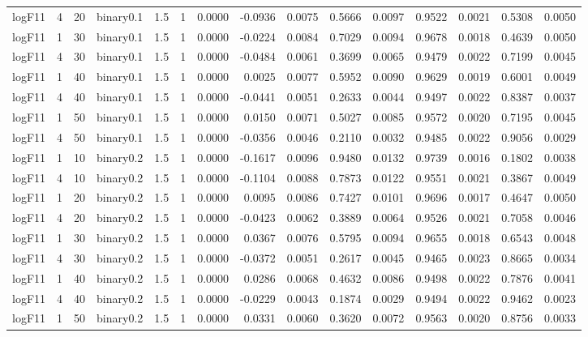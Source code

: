 \begin{longtable}{rrrrrrrrrrrrrrr}
  logF11 & 4 & 20 & binary0.1 & 1.5 & 1 & 0.0000 & -0.0936 & 0.0075 & 0.5666 & 0.0097 & 0.9522 & 0.0021 & 0.5308 & 0.0050 \\ 
  logF11 & 1 & 30 & binary0.1 & 1.5 & 1 & 0.0000 & -0.0224 & 0.0084 & 0.7029 & 0.0094 & 0.9678 & 0.0018 & 0.4639 & 0.0050 \\ 
  logF11 & 4 & 30 & binary0.1 & 1.5 & 1 & 0.0000 & -0.0484 & 0.0061 & 0.3699 & 0.0065 & 0.9479 & 0.0022 & 0.7199 & 0.0045 \\ 
  logF11 & 1 & 40 & binary0.1 & 1.5 & 1 & 0.0000 & 0.0025 & 0.0077 & 0.5952 & 0.0090 & 0.9629 & 0.0019 & 0.6001 & 0.0049 \\ 
  logF11 & 4 & 40 & binary0.1 & 1.5 & 1 & 0.0000 & -0.0441 & 0.0051 & 0.2633 & 0.0044 & 0.9497 & 0.0022 & 0.8387 & 0.0037 \\ 
  logF11 & 1 & 50 & binary0.1 & 1.5 & 1 & 0.0000 & 0.0150 & 0.0071 & 0.5027 & 0.0085 & 0.9572 & 0.0020 & 0.7195 & 0.0045 \\ 
  logF11 & 4 & 50 & binary0.1 & 1.5 & 1 & 0.0000 & -0.0356 & 0.0046 & 0.2110 & 0.0032 & 0.9485 & 0.0022 & 0.9056 & 0.0029 \\ 
  logF11 & 1 & 10 & binary0.2 & 1.5 & 1 & 0.0000 & -0.1617 & 0.0096 & 0.9480 & 0.0132 & 0.9739 & 0.0016 & 0.1802 & 0.0038 \\ 
  logF11 & 4 & 10 & binary0.2 & 1.5 & 1 & 0.0000 & -0.1104 & 0.0088 & 0.7873 & 0.0122 & 0.9551 & 0.0021 & 0.3867 & 0.0049 \\ 
  logF11 & 1 & 20 & binary0.2 & 1.5 & 1 & 0.0000 & 0.0095 & 0.0086 & 0.7427 & 0.0101 & 0.9696 & 0.0017 & 0.4647 & 0.0050 \\ 
  logF11 & 4 & 20 & binary0.2 & 1.5 & 1 & 0.0000 & -0.0423 & 0.0062 & 0.3889 & 0.0064 & 0.9526 & 0.0021 & 0.7058 & 0.0046 \\ 
  logF11 & 1 & 30 & binary0.2 & 1.5 & 1 & 0.0000 & 0.0367 & 0.0076 & 0.5795 & 0.0094 & 0.9655 & 0.0018 & 0.6543 & 0.0048 \\ 
  logF11 & 4 & 30 & binary0.2 & 1.5 & 1 & 0.0000 & -0.0372 & 0.0051 & 0.2617 & 0.0045 & 0.9465 & 0.0023 & 0.8665 & 0.0034 \\ 
  logF11 & 1 & 40 & binary0.2 & 1.5 & 1 & 0.0000 & 0.0286 & 0.0068 & 0.4632 & 0.0086 & 0.9498 & 0.0022 & 0.7876 & 0.0041 \\ 
  logF11 & 4 & 40 & binary0.2 & 1.5 & 1 & 0.0000 & -0.0229 & 0.0043 & 0.1874 & 0.0029 & 0.9494 & 0.0022 & 0.9462 & 0.0023 \\ 
  logF11 & 1 & 50 & binary0.2 & 1.5 & 1 & 0.0000 & 0.0331 & 0.0060 & 0.3620 & 0.0072 & 0.9563 & 0.0020 & 0.8756 & 0.0033 \\ 

\end{longtable}
